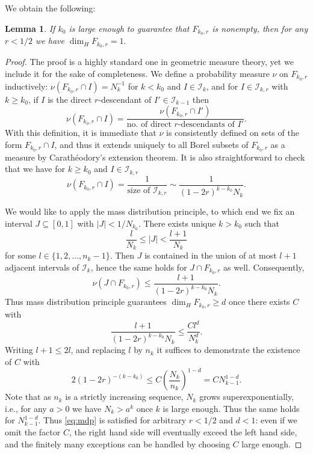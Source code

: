 \documentclass{article}
\newtheorem{lemma}[theorem]{Lemma}
\theoremstyle{definition}
\begin{document}
We obtain the following:

\begin{lemma} \label{lemma:dimension}
    If $k_0$ is large enough to guarantee that $F_{k_0,r}$ is nonempty, then for any $r<1/2$ we have $\dim_H F_{k_0, r}=1.$
\end{lemma}

\begin{proof}
    The proof is a highly standard one in geometric measure theory, yet we include it for the sake of completeness. We define a probability measure $\nu$ on $F_{k_0, r}$ inductively: $\nu(F_{k_0, r}\cap I)=N_k^{-1}$ for $k<k_0$ and $I\in \mathcal{I}_k$, and for $I\in \mathcal{I}_{k, r}$ with $k\geq k_0$, if $I$ is the direct $r$-descendant of $I'\in \mathcal{I}_{k-1}$ then
    $$\nu(F_{k_0, r}\cap I)= \frac{\nu(F_{k_0, r}\cap I')}{\text{no. of direct $r$-descendants of $I'$}}.$$
    With this definition, it is immediate that $\nu$ is consistently defined on sets of the form $F_{k_0, r}\cap I$, and thus it extends uniquely to all Borel subsets of $F_{k_0, r}$ as a measure by Carathéodory's extension theorem. It is also straightforward to check that we have for $k\geq k_0$ and $I\in \mathcal{I}_{k, r}$
    $$\nu(F_{k_0, r}\cap I)=\frac{1}{\text{size of $\mathcal{I}_{k, r}$}}\sim \frac{1}{(1-2r)^{k-k_0}N_k}.$$

    We would like to apply the mass distribution principle, to which end we fix an interval $J\subseteq [0, 1]$ with $|J|<1/N_{k_0}$. There exists unique $k>k_0$ such that
    $$\frac{l}{N_k}\leq|J|<\frac{l+1}{N_k}$$
    for some $l\in \{1, 2, \dots, n_k-1\}$. Then $J$ is contained in the union of at most $l+1$ adjacent intervals of $\mathcal{I}_k$, hence the same holds for $J\cap F_{k_0, r}$ as well. Consequently,
    $$\nu(J\cap F_{k_0, r})\leq \frac{l+1}{(1-2r)^{k-k_0}N_k}.$$
    Thus mass distribution principle guarantees $\dim_H F_{k_0, r}\geq d$ once there exists $C$ with 
    $$\frac{l+1}{(1-2r)^{k-k_0}N_k}\leq \frac{Cl^d}{N_k^d}.$$
    Writing $l+1\leq 2l$, and replacing $l$ by $n_k$ it suffices to demonstrate the existence of $C$ with
    \begin{equation}\label{eq:mdp}
    2(1-2r)^{-(k-k_0)}\leq C\left(\frac{N_k}{n_k}\right)^{1-d}=CN_{k-1}^{1-d}.
    \end{equation}
    Note that as $n_k$ is a strictly increasing sequence, $N_k$ grows superexponentially, i.e., for any $a>0$ we have $N_k>a^k$ once $k$ is large enough. Thus the same holds for $N_{k-1}^{1-d}$. Thus \eqref{eq:mdp} is satisfied for arbitrary $r<1/2$ and $d<1$: even if we omit the factor $C$, the right hand side will eventually exceed the left hand side, and the finitely many exceptions can be handled by choosing $C$ large enough.
\end{proof}
\end{document}
